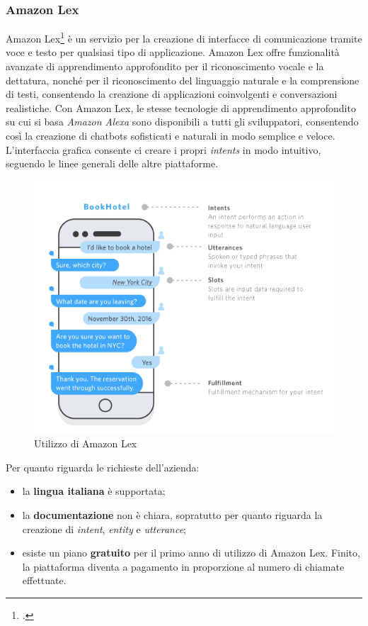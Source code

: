\subsubsection{Amazon Lex}
Amazon Lex\footcite{lex} è un servizio per la creazione di interfacce di comunicazione tramite voce e testo per qualsiasi tipo di applicazione. Amazon Lex offre funzionalità avanzate di apprendimento approfondito per il riconoscimento vocale e la dettatura, nonché per il riconoscimento del linguaggio naturale e la comprensione di testi, consentendo la creazione di applicazioni coinvolgenti e conversazioni realistiche. Con Amazon Lex, le stesse tecnologie di apprendimento approfondito su cui si basa \emph{Amazon Alexa} sono disponibili a tutti gli sviluppatori, consentendo così la creazione di \glspl{chatbot} sofisticati e naturali in modo semplice e veloce.\\
L'interfaccia grafica consente ci creare i propri \emph{intents} in modo intuitivo, seguendo le linee generali delle altre piattaforme.
\begin{figure}[!h]
	\centering
	\includegraphics[scale=0.5]{../Immagini/lex_example.png}
	\caption{Utilizzo di Amazon Lex}
\end{figure}

Per quanto riguarda le richieste dell'azienda:
\begin{itemize}
	\item la \textbf{lingua italiana} è supportata;
	\item la \textbf{documentazione} non è chiara, sopratutto per quanto riguarda la creazione di \emph{intent}, \emph{entity} e \emph{utterance};
	\item esiste un piano \textbf{gratuito} per il primo anno di utilizzo di Amazon Lex. Finito, la piattaforma diventa a pagamento in proporzione al numero di chiamate effettuate.
\end{itemize}

